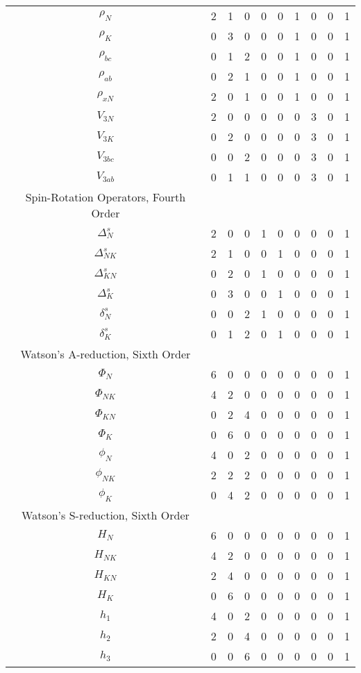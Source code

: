 \documentclass{article}
\begin{document}
\begin{longtable}[ht]{c c c c c c c c c c}
	$\rho_N$ & 2 & 1 & 0 & 0 & 0 & 1 & 0 & 0 & 1 \\
	$\rho_K$ & 0 & 3 & 0 & 0 & 0 & 1 & 0 & 0 & 1 \\
	$\rho_{bc}$ & 0 & 1 & 2 & 0 & 0 & 1 & 0 & 0 & 1 \\
	$\rho_{ab}$ & 0 & 2 & 1 & 0 & 0 & 1 & 0 & 0 & 1 \\
	$\rho_{xN}$ & 2 & 0 & 1 & 0 & 0 & 1 & 0 & 0 & 1 \\
	$V_{3N}$ & 2 & 0 & 0 & 0 & 0 & 0 & 3 & 0 & 1 \\
	$V_{3K}$ & 0 & 2 & 0 & 0 & 0 & 0 & 3 & 0 & 1 \\
	$V_{3bc}$ & 0 & 0 & 2 & 0 & 0 & 0 & 3 & 0 & 1 \\
	$V_{3ab}$ & 0 & 1 & 1 & 0 & 0 & 0 & 3 & 0 & 1 \\
	Spin-Rotation Operators, Fourth Order &&&&&&&&&\\
	$\Delta_N^s$ & 2 & 0 & 0 & 1 & 0 & 0 & 0 & 0 & 1 \\
	$\Delta_{NK}^s$ & 2 & 1 & 0 & 0 & 1 & 0 & 0 & 0 & 1 \\
	$\Delta_{KN}^s$ & 0 & 2 & 0 & 1 & 0 & 0 & 0 & 0 & 1 \\
	$\Delta_{K}^s$ & 0 & 3 & 0 & 0 & 1 & 0 & 0 & 0 & 1 \\
	$\delta_{N}^s$ & 0 & 0 & 2 & 1 & 0 & 0 & 0 & 0 & 1 \\
	$\delta_{K}^s$ & 0 & 1 & 2 & 0 & 1 & 0 & 0 & 0 & 1 \\
	Watson's A-reduction, Sixth Order &&&&&&&&&\\
	$\Phi_N$ & 6 & 0 & 0 & 0 & 0 & 0 & 0 & 0 & 1 \\
	$\Phi_{NK}$ & 4 & 2 & 0 & 0 & 0 & 0 & 0 & 0 & 1 \\
	$\Phi_{KN}$ & 0 & 2 & 4 & 0 & 0 & 0 & 0 & 0 & 1 \\
	$\Phi_K$ & 0 & 6 & 0 & 0 & 0 & 0 & 0 & 0 & 1 \\
	$\phi_N$ & 4 & 0 & 2 & 0 & 0 & 0 & 0 & 0 & 1 \\
	$\phi_{NK}$ & 2 & 2 & 2 & 0 & 0 & 0 & 0 & 0 & 1 \\
	$\phi_K$ & 0 & 4 & 2 & 0 & 0 & 0 & 0 & 0 & 1 \\
	Watson's S-reduction, Sixth Order &&&&&&&&&\\
	$H_N$ & 6 & 0 & 0 & 0 & 0 & 0 & 0 & 0 & 1 \\
	$H_{NK}$ & 4 & 2 & 0 & 0 & 0 & 0 & 0 & 0 & 1 \\
	$H_{KN}$ & 2 & 4 & 0 & 0 & 0 & 0 & 0 & 0 & 1 \\
	$H_K$ & 0 & 6 & 0 & 0 & 0 & 0 & 0 & 0 & 1 \\
	$h_1$ & 4 & 0 & 2 & 0 & 0 & 0 & 0 & 0 & 1 \\
	$h_2$ & 2 & 0 & 4 & 0 & 0 & 0 & 0 & 0 & 1 \\
	$h_3$ & 0 & 0 & 6 & 0 & 0 & 0 & 0 & 0 & 1 \\	
\end{longtable}
\end{document}
